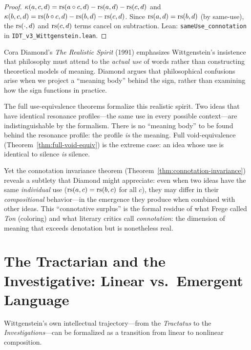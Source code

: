 \begin{proof}
$\kappa(a,c,d) = \mathrm{rs}(a \circ c, d) - \mathrm{rs}(a,d) - \mathrm{rs}(c,d)$ and
$\kappa(b,c,d) = \mathrm{rs}(b \circ c, d) - \mathrm{rs}(b,d) - \mathrm{rs}(c,d)$. Since
$\mathrm{rs}(a,d) = \mathrm{rs}(b,d)$ (by same-use), the $\mathrm{rs}(\cdot, d)$ and $\mathrm{rs}(c,d)$ terms
cancel on subtraction.
Lean: \texttt{sameUse\_connotation} in \texttt{IDT\_v3\_Wittgenstein.lean}.
\end{proof}

\begin{interpretation}
Cora Diamond's \textit{The Realistic Spirit} (1991) emphasizes Wittgenstein's
insistence that philosophy must attend to the \emph{actual use} of words rather
than constructing theoretical models of meaning. Diamond argues that philosophical
confusions arise when we project a ``meaning body'' behind the sign, rather than
examining how the sign functions in practice.

The full use-equivalence theorems formalize this realistic spirit. Two ideas that
have identical resonance profiles---the same use in every possible context---are
indistinguishable by the formalism. There is no ``meaning body'' to be found
behind the resonance profile: the profile \emph{is} the meaning. Full
void-equivalence (Theorem~\ref{thm:full-void-equiv}) is the extreme case:
an idea whose use is identical to silence \emph{is} silence.

Yet the connotation invariance theorem (Theorem~\ref{thm:connotation-invariance})
reveals a subtlety that Diamond might appreciate: even when two ideas have the
same \emph{individual} use ($\mathrm{rs}(a,c) = \mathrm{rs}(b,c)$ for all $c$), they may
differ in their \emph{compositional} behavior---in the emergence they produce
when combined with other ideas. This ``connotative surplus'' is the formal
residue of what Frege called \emph{Ton} (coloring) and what literary critics
call \emph{connotation}: the dimension of meaning that exceeds denotation but
is nonetheless real.
\end{interpretation}

\section{The Tractarian and the Investigative: Linear vs.\ Emergent Language}

Wittgenstein's own intellectual trajectory---from the \textit{Tractatus} to
the \textit{Investigations}---can be formalized as a transition from linear to
nonlinear composition.

